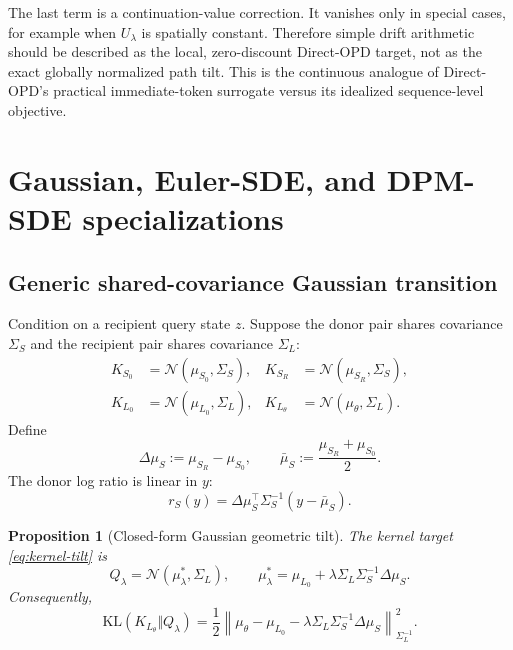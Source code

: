 \documentclass[11pt,a4paper]{article}
\newcommand{\N}{\mathcal{N}}
\newcommand{\KL}{\mathrm{KL}}
\newcommand{\norm}[1]{\left\lVert #1 \right\rVert}
\newcommand{\Sbase}{S_0}
\newcommand{\Srl}{S_R}
\newcommand{\Lbase}{L_0}
\newcommand{\Lactor}{L_\theta}
\newcommand{\dmuS}{\Delta\mu_S}
\theoremstyle{plain}
\newtheorem{proposition}[theorem]{Proposition}
\theoremstyle{definition}
\begin{document}
The last term is a continuation-value correction.  It vanishes only in special cases, for example
when $U_\lambda$ is spatially constant.  Therefore simple drift arithmetic should be described as
the local, zero-discount Direct-OPD target, not as the exact globally normalized path tilt.  This
is the continuous analogue of Direct-OPD's practical immediate-token surrogate versus its
idealized sequence-level objective.

\section{Gaussian, Euler-SDE, and DPM-SDE specializations}
\label{sec:dpm-sde}

\subsection{Generic shared-covariance Gaussian transition}

Condition on a recipient query state $z$.  Suppose the donor pair shares covariance $\Sigma_S$
and the recipient pair shares covariance $\Sigma_L$:
\begin{align}
K_{\Sbase}&=\N(\mu_{\Sbase},\Sigma_S),
&
K_{\Srl}&=\N(\mu_{\Srl},\Sigma_S),
\nonumber\\
K_{\Lbase}&=\N(\mu_{\Lbase},\Sigma_L),
&
K_{\Lactor}&=\N(\mu_\theta,\Sigma_L).
\label{eq:two-covariance-gaussians}
\end{align}
Define
\begin{equation}
\dmuS:=\mu_{\Srl}-\mu_{\Sbase},
\qquad
\bar\mu_S:=\frac{\mu_{\Srl}+\mu_{\Sbase}}2.
\label{eq:mean-shift}
\end{equation}
The donor log ratio is linear in $y$:
\begin{equation}
r_S(y)
=
\dmuS^\top\Sigma_S^{-1}(y-\bar\mu_S).
\label{eq:gaussian-log-ratio}
\end{equation}

\begin{proposition}[Closed-form Gaussian geometric tilt]
\label{prop:gaussian-tilt}
The kernel target \eqref{eq:kernel-tilt} is
\begin{equation}
Q_\lambda
=
\N(\mu_\lambda^*,\Sigma_L),
\qquad
\boxed{
\mu_\lambda^*
=
\mu_{\Lbase}
+\lambda\Sigma_L\Sigma_S^{-1}\dmuS.
}
\label{eq:gaussian-target-mean}
\end{equation}
Consequently,
\begin{equation}
\boxed{
\KL(K_{\Lactor}\Vert Q_\lambda)
=
\frac12
\norm{
\mu_\theta-\mu_{\Lbase}
-\lambda\Sigma_L\Sigma_S^{-1}\dmuS
}_{\Sigma_L^{-1}}^2.
}
\label{eq:gaussian-training-kl}
\end{equation}
\end{proposition}
\end{document}
